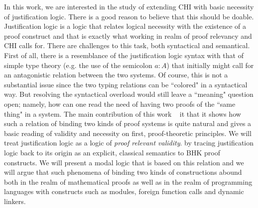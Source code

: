 In this work, we are interested in the study of  extending  \acrfull{CHI} 
with basic  necessity of justification logic. 
There is a good reason to believe that this should be doable. Justification logic
 is a logic that relates logical necessity with the existence of a proof construct
  and that is exactly what working in  realm of proof relevancy and \ac{CHI} calls for. 
  There are challenges to this task, both syntactical and  semantical. First of all, there
   is a resemblance of the justification logic syntax with that of simple type theory 
   (e.g. the use of the semicolon $a:A$) that  initially might call for an antagonistic relation
    between the two systems. Of course, this is not a substantial issue since the two
     typing relations can be ``colored" in a syntactical way. 
     But resolving the syntactical overload would still leave a  ``meaning" question open;
      namely, how can one read  the need of having two
       proofs of the ``same thing" in a system. 
       The main contribution of this work  
       ~\cite{Pouliasis2016} it that it  shows how such a relation of binding two kinds of
        proof systems is quite natural and gives a basic reading of validity and necessity 
        on first, proof-theoretic principles.  
        We will treat justification logic as a logic of \textit{proof relevant validity}.
         by tracing justification logic back to its 
         origin as an explicit, classical semantics to \ac{BHK} proof constructs. 
         We will present a modal logic that is based on this relation and we will argue
          that such phenomena of binding two kinds of constructions abound both
           in the realm  of mathematical proofs 
           as well as in the realm of programming languages  with constructs 
           such as modules, foreign function calls and dynamic linkers.

